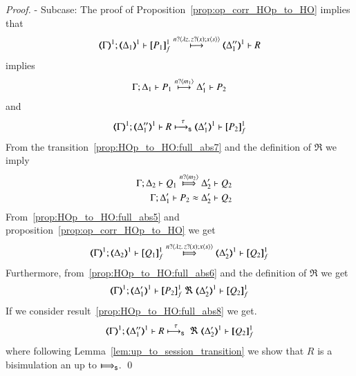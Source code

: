\begin{proof}
	\noi - Subcase:
	\noi The proof of Proposition~\ref{prop:op_corr_HOp_to_HO} implies that
%
	\[
		\horel{\mapt{\Gamma}^{1}}{\mapt{\Delta_1}^{1}}{\pmapp{P_1}{1}{f}}{\hby{\bactinp{n}{\abs{z}{ \binp{z}{x} \appl{x}{s}}}}}{\mapt{\Delta_1''}^{1}} R %
	\]
%
	\noi implies
%
	\begin{eqnarray}
		\Gamma; \Delta_1 \vdash P_1 \stackrel{n ? \langle m_1 \rangle}{\longmapsto} \Delta_1' \vdash P_2
		\label{prop:HOp_to_HO:full_abs7}
	\end{eqnarray}
%
	\noi and
%
	\begin{eqnarray}
		\horel{\mapt{\Gamma}^{1}}{\mapt{\Delta_1''}^{1}}{R}{\shby{\tau}}{\mapt{\Delta_1'}^{1}}{\pmapp{P_2}{1}{f}}
		\label{prop:HOp_to_HO:full_abs8}
	\end{eqnarray}
%
%
	\noi From the transition~\ref{prop:HOp_to_HO:full_abs7} and the definition of $\Re$ we imply
%
	\begin{eqnarray}
		&&\horel{\Gamma}{\Delta_2}{Q_1}{\Hby{\bactinp{n}{m_2}}}{\Delta_2'}{Q_2}
		\label{prop:HOp_to_HO:full_abs5}
		\\
		&&\horel{\Gamma}{\Delta_1'}{P_2}{\wb}{\Delta_2'}{Q_2}
		\label{prop:HOp_to_HO:full_abs6}
	\end{eqnarray}
%
	\noi From~\ref{prop:HOp_to_HO:full_abs5} and proposition~\ref{prop:op_corr_HOp_to_HO} we get
%
	\[
		\horel{\mapt{\Gamma}^{1}}{\mapt{\Delta_2}^{1}}{\pmapp{Q_1}{1}{f}}{\Hby{\bactinp{n}{\abs{z}{\binp{z}{x} \appl{x}{s}}}}}{\mapt{\Delta_2'}^{1}}{\pmapp{Q_2}{1}{f}}
	\]
%
	\noi Furthermore, from~\ref{prop:HOp_to_HO:full_abs6} and the definition of $\Re$ we get
%
	\[
		\horel{\mapt{\Gamma}^{1}}{\mapt{\Delta_1'}^{1}}{\pmapp{P_2}{1}{f}}{\ \Re\ }{\mapt{\Delta_2'}^{1}}{\pmapp{Q_2}{1}{f}}
	\]
%
	\noi If we consider result~\ref{prop:HOp_to_HO:full_abs8} we get.
%
	\[
		\horel{\mapt{\Gamma}^{1}}{\mapt{\Delta_1''}^{1}}{R}{\shby{\tau}\ \Re\ }{\mapt{\Delta_2'}^{1}}{\pmapp{Q_2}{1}{f}}
	\]
	where following Lemma~\ref{lem:up_to_session_transition} we show that $R$ is a bisimulation an up to $\SHby{}$.
	\qed
\end{proof}

%

